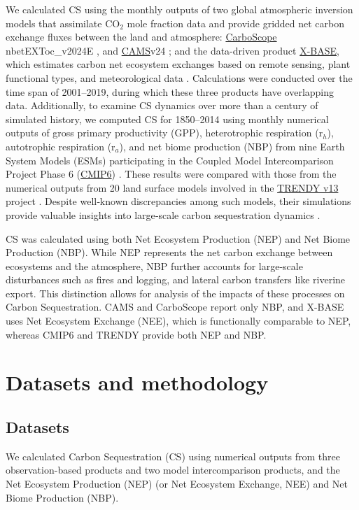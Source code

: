 \documentclass[ProofPDF]{./Styles/Jnls-Template-V3}
\begin{document}
We calculated CS using the monthly outputs of two global atmospheric inversion models that assimilate CO$_2$ mole fraction data and provide gridded net carbon exchange fluxes between the land and atmosphere: \hyperlink{https://www.bgc-jena.mpg.de/CarboScope/}{CarboScope} nbetEXToc\_v2024E \citep{Rodenbeck2005}, and \hyperlink{https://ads.atmosphere.copernicus.eu/datasets/cams-global-greenhouse-gas-inversion?tab=overview}{CAMS}v24 \citep{Chevallier2013}; and the data-driven product \hyperlink{https://www.icos-cp.eu/data-products/fluxcom-x-global-fluxes-collection}{X-BASE}, which estimates carbon net ecosystem exchanges based on remote sensing, plant functional types, and meteorological data \citep{Nelson2024}. Calculations were conducted over the time span of 2001–2019, during which these three products have overlapping data. Additionally, to examine CS dynamics over more than a century of simulated history, we computed CS for 1850–2014 using monthly numerical outputs of gross primary productivity (GPP), heterotrophic respiration (r$_h$), autotrophic respiration (r$_a$), and net biome production (NBP) from nine Earth System Models (ESMs) participating in the Coupled Model Intercomparison Project Phase 6 (\hyperlink{https://pcmdi.llnl.gov/CMIP6/}{CMIP6}) \citep{Eyring2016}. These results were compared with those from the numerical outputs from 20 land surface models involved in the \hyperlink{https://globalcarbonbudgetdata.org/}{TRENDY v13} project \citep{Sitch2024}. Despite well‑known discrepancies among such models, their simulations provide valuable insights into large‑scale carbon sequestration dynamics \citep{Gier2024,Sitch2024}.
  
CS was calculated using both Net Ecosystem Production (NEP) and Net Biome Production (NBP). While NEP represents the net carbon exchange between ecosystems and the atmosphere, NBP further accounts for large-scale disturbances such as fires and logging, and lateral carbon transfers like riverine export. This distinction allows for analysis of the impacts of these processes on Carbon Sequestration. CAMS and CarboScope report only NBP, and X-BASE uses Net Ecosystem Exchange (NEE), which is functionally comparable to NEP,  whereas CMIP6 and TRENDY provide both NEP and NBP.

\section{Datasets and methodology}\label{sec:methods}
\subsection{Datasets} 
We calculated Carbon Sequestration (CS) using numerical outputs from three observation-based products and two model intercomparison products, and the Net Ecosystem Production (NEP) (or Net Ecosystem Exchange, NEE) and Net Biome Production (NBP).
\end{document}
